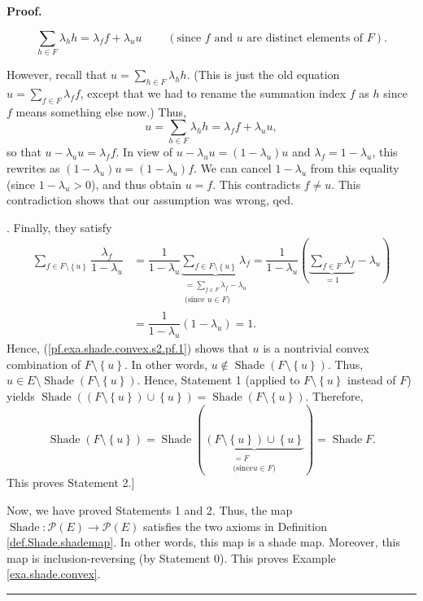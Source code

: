 \documentclass[numbers=enddot,12pt,final,onecolumn]{scrartcl}%
\theoremstyle{definition}
\newenvironment{proof}[1][Proof]{\noindent\textbf{#1.} }{\ \rule{0.5em}{0.5em}}
\let\sumnonlimits\sum
\renewcommand{\sum}{\sumnonlimits\limits}
\newenvironment{verlong}{}{}
\begin{document}
\begin{verlong}
\begin{proof}
{\[
\sum_{h\in F}\lambda_{h}h=\lambda_{f}f+\lambda_{u}u\ \ \ \ \ \ \ \ \ \ \left(
\text{since }f\text{ and }u\text{ are distinct elements of }F\right)  .
\]
\par
However, recall that $u=\sum_{h\in F}\lambda_{h}h$. (This is just the old
equation $u=\sum_{f\in F}\lambda_{f}f$, except that we had to rename the
summation index $f$ as $h$ since $f$ means something else now.) Thus,%
\[
u=\sum_{h\in F}\lambda_{h}h=\lambda_{f}f+\lambda_{u}u,
\]
so that $u-\lambda_{u}u=\lambda_{f}f$. In view of $u-\lambda_{u}u=\left(
1-\lambda_{u}\right)  u$ and $\lambda_{f}=1-\lambda_{u}$, this rewrites as
$\left(  1-\lambda_{u}\right)  u=\left(  1-\lambda_{u}\right)  f$. We can
cancel $1-\lambda_{u}$ from this equality (since $1-\lambda_{u}>0$), and thus
obtain $u=f$. This contradicts $f\neq u$. This contradiction shows that our
assumption was wrong, qed.}. Finally, they satisfy
\begin{align*}
\sum_{f\in F\setminus\left\{  u\right\}  }\dfrac{\lambda_{f}}{1-\lambda_{u}}
&  =\dfrac{1}{1-\lambda_{u}}\underbrace{\sum_{f\in F\setminus\left\{
u\right\}  }\lambda_{f}}_{\substack{=\sum_{f\in F}\lambda_{f}-\lambda
_{u}\\\text{(since }u\in F\text{)}}}=\dfrac{1}{1-\lambda_{u}}\left(
\underbrace{\sum_{f\in F}\lambda_{f}}_{=1}-\lambda_{u}\right) \\
&  =\dfrac{1}{1-\lambda_{u}}\left(  1-\lambda_{u}\right)  =1.
\end{align*}
Hence, (\ref{pf.exa.shade.convex.s2.pf.1}) shows that $u$ is a nontrivial
convex combination of $F\setminus\left\{  u\right\}  $. In other words,
$u\notin\operatorname*{Shade}\left(  F\setminus\left\{  u\right\}  \right)  $.
Thus, $u\in E\setminus\operatorname*{Shade}\left(  F\setminus\left\{
u\right\}  \right)  $. Hence, Statement 1 (applied to $F\setminus\left\{
u\right\}  $ instead of $F$) yields $\operatorname*{Shade}\left(  \left(
F\setminus\left\{  u\right\}  \right)  \cup\left\{  u\right\}  \right)
=\operatorname*{Shade}\left(  F\setminus\left\{  u\right\}  \right)  $.
Therefore,%
\[
\operatorname*{Shade}\left(  F\setminus\left\{  u\right\}  \right)
=\operatorname*{Shade}\left(  \underbrace{\left(  F\setminus\left\{
u\right\}  \right)  \cup\left\{  u\right\}  }_{\substack{=F\\\text{(since
}u\in F\text{)}}}\right)  =\operatorname*{Shade}F.
\]
This proves Statement 2.]

Now, we have proved Statements 1 and 2. Thus, the map $\operatorname*{Shade}%
:\mathcal{P}\left(  E\right)  \rightarrow\mathcal{P}\left(  E\right)  $
satisfies the two axioms in Definition \ref{def.Shade.shademap}. In other
words, this map is a shade map. Moreover, this map is inclusion-reversing (by
Statement 0). This proves Example \ref{exa.shade.convex}.
\end{proof}
\end{verlong}
\end{document}
